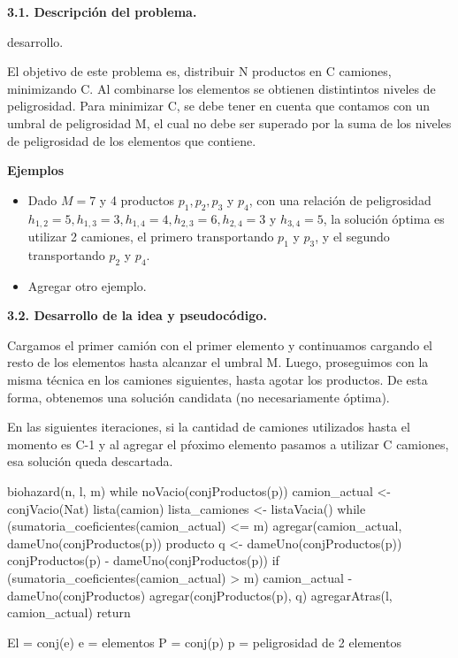 \noindent
\textbf{3.1. Descripción del problema.}

\vspace*{0.3cm}

desarrollo.

\vspace*{0.75cm} \noindent

El objetivo de este problema es, distribuir N productos en C camiones, minimizando
C. Al combinarse los elementos se obtienen distintintos niveles de peligrosidad.
Para minimizar C, se debe tener en cuenta que contamos con un umbral de peligrosidad
M, el cual no debe ser superado por la suma de los niveles de peligrosidad de los
elementos que contiene.

\textbf{Ejemplos}
\begin{itemize}
  \item Dado $M = 7$ y 4 productos $p_1, p_2, p_3$ y $p_4$, con una relación
  de peligrosidad $h_{1,2} = 5, h_{1,3} = 3, h_{1,4} = 4, h_{2,3} = 6, h_{2,4} =
  3$ y $h_{3,4} = 5$, la solución óptima es utilizar 2 camiones, el primero
  transportando $p_1$ y $p_3$, y el segundo transportando $p_2$ y $p_4$.
  \item Agregar otro ejemplo.
\end{itemize}

\noindent
\textbf{3.2. Desarrollo de la idea y pseudocódigo.}

Cargamos el primer camión con el primer elemento y continuamos cargando el resto 
de los elementos hasta alcanzar el umbral M. Luego, proseguimos con la misma 
técnica en los camiones siguientes, hasta agotar los productos. De esta forma, 
obtenemos una solución candidata (no necesariamente óptima).

En las siguientes iteraciones, si la cantidad de camiones utilizados hasta el 
momento es C-1 y al agregar el pŕoximo elemento pasamos a utilizar C camiones, 
esa solución queda descartada.


biohazard(n, l, m)
  while noVacio(conjProductos(p))
    camion_actual <- conjVacio(Nat)
    lista(camion) lista_camiones <- listaVacia()
    while (sumatoria_coeficientes(camion_actual) <= m)
      agregar(camion_actual, dameUno(conjProductos(p))
      producto q <- dameUno(conjProductos(p))
      conjProductos(p) - dameUno(conjProductos(p))
      if (sumatoria_coeficientes(camion_actual) > m)
        camion_actual - dameUno(conjProductos)
        agregar(conjProductos(p), q)
    agregarAtras(l, camion_actual)
  return 
  
  
  El = conj(e)  {e = elementos}
  P = conj(p)   {p = peligrosidad de 2 elementos}
  

